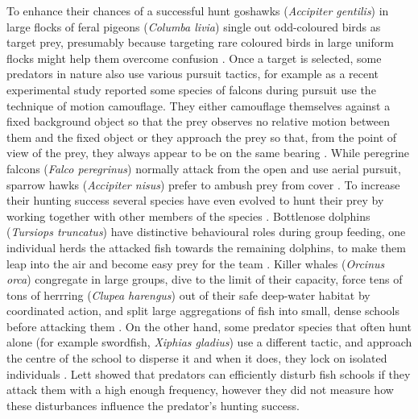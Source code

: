 To enhance their chances of a successful hunt goshawks (\emph{Accipiter gentilis}) in large flocks of feral pigeons (\emph{Columba livia}) single out odd-coloured birds as target prey, presumably because targeting rare coloured birds in large uniform flocks might help them overcome confusion \cite{rutz2012predator}. Once a target is selected, some predators in nature also use various pursuit tactics, for example as a recent experimental study reported \cite{kane2014falcons} some species of falcons during pursuit use the technique of motion camouflage. They either camouflage themselves against a fixed background object so that the prey observes no relative motion between them and the fixed object or they approach the prey so that, from the point of view of the prey, they always appear to be on the same bearing \cite{justh2006steering}. While peregrine falcons (\emph{Falco peregrinus}) normally attack from the open and use aerial pursuit, sparrow hawks (\emph{Accipiter nisus}) prefer to ambush prey from cover \cite{cresswell2011predicting}. To increase their hunting success several species have even evolved to hunt their prey by working together with other members of the species \cite{alcock1979animal,handegard2012dynamics,packer1988evolution}. Bottlenose dolphins (\emph{Tursiops truncatus}) have distinctive behavioural roles during group feeding, one individual herds the attacked fish towards the remaining dolphins, to make them leap into the air and become easy prey for the team \cite{gazda2005division,lopez2006bottlenose}. Killer whales (\emph{Orcinus orca}) congregate in large groups, dive to the limit of their capacity, force tens of tons of herrring (\emph{Clupea harengus}) out of their safe deep-water habitat by coordinated action, and split large aggregations of fish into small, dense schools before attacking them \cite{nottestad2002digging}. On the other hand, some predator species that often hunt alone (for example swordfish, \emph{Xiphias gladius}) use a different tactic, and approach the centre of the school to disperse it and when it does, they lock on isolated individuals \cite{larsson2012why,pavlov2000patterns}. Lett\etal \cite{lett2014effects} showed that predators can efficiently disturb fish schools if they attack them with a high enough frequency, however they did not measure how these disturbances influence the predator's hunting success.

